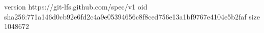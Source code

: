 version https://git-lfs.github.com/spec/v1
oid sha256:771a146d0cb92e6fd2c4a9e05394656c8f8ced756e13a1bf9767e4104e5b2faf
size 1048672

